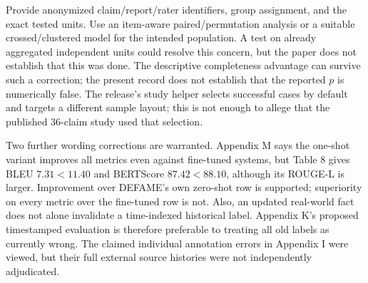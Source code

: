 \documentclass[10pt]{article}
\begin{document}
Provide anonymized claim/report/rater identifiers, group assignment, and the exact tested units. Use an item-aware paired/permutation analysis or a suitable crossed/clustered model for the intended population. A test on already aggregated independent units could resolve this concern, but the paper does not establish that this was done. The descriptive completeness advantage can survive such a correction; the present record does not establish that the reported \(p\) is numerically false. The release’s study helper selects successful cases by default and targets a different sample layout; this is not enough to allege that the published 36-claim study used that selection.\par
Two further wording corrections are warranted. Appendix M says the one-shot variant improves all metrics even against fine-tuned systems, but Table 8 gives BLEU \(7.31<11.40\) and BERTScore \(87.42<88.10\), although its ROUGE-L is larger. Improvement over DEFAME’s own zero-shot row is supported; superiority on every metric over the fine-tuned row is not. Also, an updated real-world fact does not alone invalidate a time-indexed historical label. Appendix K’s proposed timestamped evaluation is therefore preferable to treating all old labels as currently wrong. The claimed individual annotation errors in Appendix I were viewed, but their full external source histories were not independently adjudicated.\par
\end{document}
